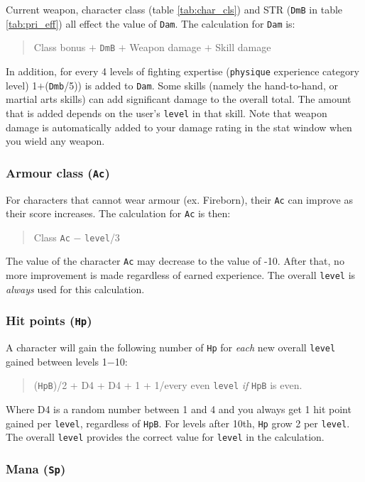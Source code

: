 Current weapon, character class 
(table \ref{tab:char_cls}) and STR ({\tt DmB} in table \ref{tab:pri_eff}) 
all effect the value of {\tt Dam}. The calculation for {\tt Dam} is:
\begin{quote}
Class bonus $+$ {\tt DmB} $+$ Weapon damage $+$ Skill damage 
\end{quote}
In addition, for every 4 levels of fighting expertise ({\tt physique} 
experience category level) 1$+$({\tt Dmb}/5)) is added to {\tt Dam}. 
Some skills (namely the hand-to-hand, or martial arts skills) 
can add significant damage to the overall total. The amount
that is added depends on the user's {\tt level} in that skill.
Note that weapon damage is automatically added to your damage
rating in the stat window when you wield any weapon.


\subsubsection{Armour class ({\tt Ac})}

For characters that cannot wear armour (ex. Fireborn), their 
{\tt Ac} can improve as their score increases. The calculation for {\tt Ac} is then: 
\begin{quote}
Class {\tt Ac} $-$ {\tt level}/3
\end{quote}
The value of the character {\tt Ac} may decrease to the value of -10.
After that, no more improvement is made regardless of earned
experience. The overall {\tt level} is 
{\em always} used for this calculation.


\subsubsection{Hit points ({\tt Hp})} 

A character will gain the following number of {\tt Hp} for {\em each} new
overall {\tt level} gained between levels 1$-$10:
\begin{quote}
({\tt HpB})/2 + D4 + D4 + 1 + 1/every even {\tt level} {\em if} {\tt HpB} is even.
\end{quote}
Where D4 is a random number between 1 and 4 and you always get 1 hit point
gained per {\tt level}, regardless of {\tt HpB}. 
For levels after 10th, {\tt Hp} grow 2 per {\tt level}.
The overall {\tt level} provides the correct value for {\tt level} in 
the calculation.
 

\subsubsection{Mana ({\tt Sp})} 

